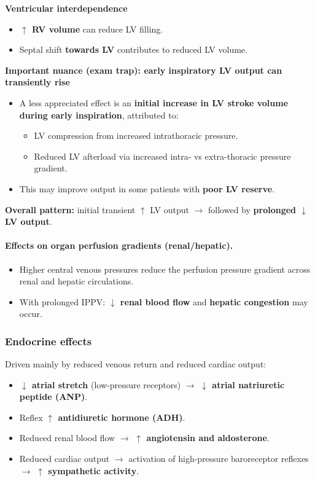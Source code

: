 \documentclass[11pt,a4paper]{article}
\begin{document}
\textbf{Ventricular interdependence}
\begin{itemize}
  \item \textbf{$\uparrow$ RV volume} can reduce LV filling.
  \item Septal shift \textbf{towards LV} contributes to reduced LV volume.
\end{itemize}

\textbf{Important nuance (exam trap): early inspiratory LV output can transiently rise}
\begin{itemize}
  \item A less appreciated effect is an \textbf{initial increase in LV stroke volume during early inspiration}, attributed to:
  \begin{itemize}
    \item LV compression from increased intrathoracic pressure.
    \item Reduced LV afterload via increased intra- vs extra-thoracic pressure gradient.
  \end{itemize}
  \item This may improve output in some patients with \textbf{poor LV reserve}.
\end{itemize}

\textbf{Overall pattern:} initial transient $\uparrow$ LV output $\rightarrow$ followed by \textbf{prolonged $\downarrow$ LV output}.

\paragraph{Effects on organ perfusion gradients (renal/hepatic).}
\begin{itemize}
  \item Higher central venous pressures reduce the perfusion pressure gradient across renal and hepatic circulations.
  \item With prolonged IPPV: \textbf{$\downarrow$ renal blood flow} and \textbf{hepatic congestion} may occur.
\end{itemize}

\subsubsection{Endocrine effects}
Driven mainly by reduced venous return and reduced cardiac output:
\begin{itemize}
  \item \textbf{$\downarrow$ atrial stretch} (low-pressure receptors) $\rightarrow$ \textbf{$\downarrow$ atrial natriuretic peptide (ANP)}.
  \item Reflex \textbf{$\uparrow$ antidiuretic hormone (ADH)}.
  \item Reduced renal blood flow $\rightarrow$ \textbf{$\uparrow$ angiotensin and aldosterone}.
  \item Reduced cardiac output $\rightarrow$ activation of high-pressure baroreceptor reflexes $\rightarrow$ \textbf{$\uparrow$ sympathetic activity}.
\end{itemize}
\end{document}
